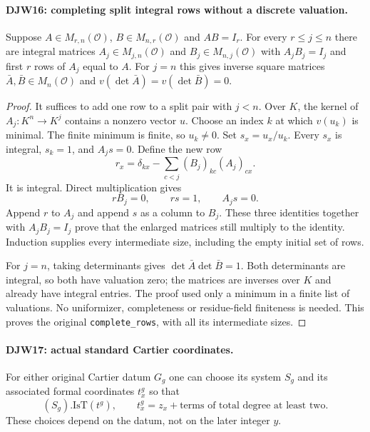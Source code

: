 \documentclass[11pt,a4paper]{article}
\numberwithin{equation}{section}
\theoremstyle{remark}\newtheorem{remark}[theorem]{Remark}
\begin{document}
\paragraph{DJW16: completing split integral rows without a discrete valuation.}
\label{claim:DJW16}
Suppose $A\in M_{r,n}(\mathcal O)$,
$B\in M_{n,r}(\mathcal O)$ and $AB=I_r$.
For every $r\le j\le n$ there are integral matrices
$A_j\in M_{j,n}(\mathcal O)$ and $B_j\in M_{n,j}(\mathcal O)$
with $A_jB_j=I_j$ and first $r$ rows of $A_j$ equal to $A$.
For $j=n$ this gives inverse square matrices
$\bar A,\bar B\in M_n(\mathcal O)$ and
$v(\det\bar A)=v(\det\bar B)=0$.

\begin{proof}
It suffices to add one row to a split pair with $j<n$.
Over $K$, the kernel of $A_j:K^n\to K^j$ contains a nonzero
vector $u$.  Choose an index $k$ at which $v(u_k)$ is minimal.
The finite minimum is finite, so $u_k\ne0$.
Set $s_x=u_x/u_k$.  Every $s_x$ is integral, $s_k=1$, and
$A_js=0$.  Define the new row
\[
 r_x=\delta_{kx}-\sum_{c<j}(B_j)_{kc}(A_j)_{cx}.
\]
It is integral.  Direct multiplication gives
\[
 rB_j=0,\qquad rs=1,\qquad A_js=0.
\]
Append $r$ to $A_j$ and append $s$ as a column to $B_j$.
These three identities together with $A_jB_j=I_j$ prove that
the enlarged matrices still multiply to the identity.
Induction supplies every intermediate size, including the empty
initial set of rows.

For $j=n$, taking determinants gives
$\det\bar A\det\bar B=1$.
Both determinants are integral, so both have valuation zero;
the matrices are inverses over $K$ and already have integral
entries.  The proof used only a minimum in a finite list of
valuations.  No uniformizer, completeness or residue-field
finiteness is needed.  This proves the original
\texttt{complete\_\allowbreak rows}, with all its intermediate sizes.
\end{proof}

\paragraph{DJW17: actual standard Cartier coordinates.}
\label{claim:DJW17}
For either original Cartier datum $G_g$ one can choose its system
$S_g$ and its associated formal coordinates $t^g_x$ so that
\[
 (S_g).\mathrm{IsT}(t^g),\qquad
 t^g_x=z_x+\text{terms of total degree at least two}.
\]
These choices depend on the datum, not on the later integer $y$.
\end{document}
